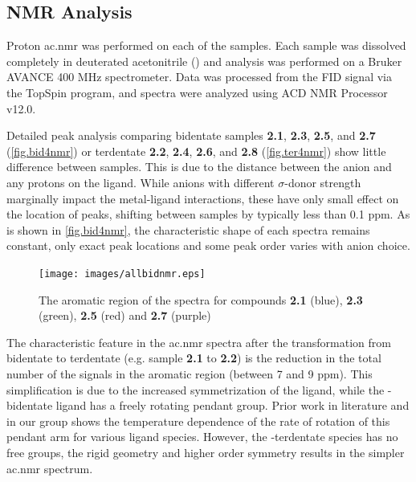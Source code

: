 \subsection{NMR Analysis}

Proton \gls{ac.nmr} was performed on each of the samples. Each sample was dissolved completely in deuterated acetonitrile () and analysis was performed on a Bruker AVANCE 400 MHz spectrometer. Data was processed from the FID signal via the TopSpin program, and spectra were analyzed using ACD NMR Processor v12.0. 

Detailed peak analysis comparing bidentate samples \textbf{2.1}, \textbf{2.3}, \textbf{2.5}, and \textbf{2.7} (\autoref{fig.bid4nmr}) or terdentate \textbf{2.2}, \textbf{2.4}, \textbf{2.6}, and \textbf{2.8} (\autoref{fig.ter4nmr}) show little difference between samples. This is due to the distance between the anion and any protons on the ligand. While anions with different $\sigma$-donor strength marginally impact the metal-ligand interactions, these have only small effect on the location of peaks, shifting between samples by typically less than 0.1 ppm. As is shown in \autoref{fig.bid4nmr}, the characteristic shape of each spectra remains constant, only exact peak locations and some peak order varies with anion choice. 


\begin{figure}[!htb]
 \begin{center}
  \texttt{[image: images/allbidnmr.eps]}
 \end{center}
\caption[The aromatic region of the \texorpdfstring{}{1H}  spectra of the four bidentate compounds]{The aromatic region of the \texorpdfstring{}{1H}  spectra for compounds \textbf{2.1} (blue), \textbf{2.3} (green), \textbf{2.5} (red) and \textbf{2.7} (purple)}
\label{fig.bid4nmr}
\end{figure} 

The characteristic feature in the \gls{ac.nmr} spectra after the transformation from bidentate to terdentate (e.g. sample \textbf{2.1} to \textbf{2.2}) is the reduction in the total number of the signals in the aromatic region (between 7 and 9 ppm). This simplification is due to the increased symmetrization of the ligand, while the -bidentate ligand has a freely rotating pendant group. Prior work in literature\autocite{abel1993} and in our group\autocite{jurca2012} shows the temperature dependence of the rate of rotation of this pendant arm for various ligand species. However, the -terdentate species has no free groups, the rigid geometry and higher order symmetry results in the simpler \gls{ac.nmr} spectrum.

